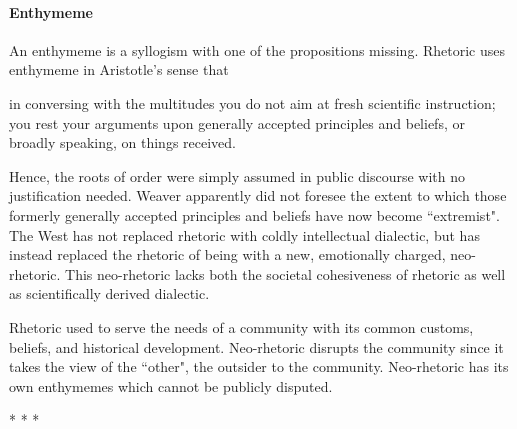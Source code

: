 \paragraph{Enthymeme}
An enthymeme is a syllogism with one of the propositions missing. Rhetoric uses enthymeme in Aristotle's sense that

\begin{quotex}
in conversing with the multitudes you do not aim at fresh scientific instruction; you rest your arguments upon generally accepted principles and beliefs, or broadly speaking, on things received. 

\end{quotex}
Hence, the roots of order were simply assumed in public discourse with no justification needed. Weaver apparently did not foresee the extent to which those formerly generally accepted principles and beliefs have now become ``extremist". The West has not replaced rhetoric with coldly intellectual dialectic, but has instead replaced the rhetoric of being with a new, emotionally charged, neo-rhetoric. This neo-rhetoric lacks both the societal cohesiveness of rhetoric as well as scientifically derived dialectic.

Rhetoric used to serve the needs of a community with its common customs, beliefs, and historical development. Neo-rhetoric disrupts the community since it takes the view of the ``other", the outsider to the community. Neo-rhetoric has its own enthymemes which cannot be publicly disputed.




\begin{center}* * *\end{center}

